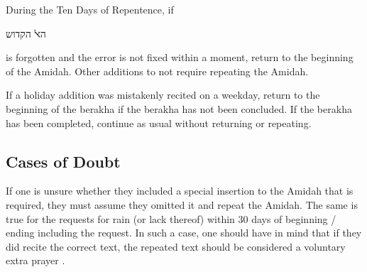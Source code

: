 \documentclass[11pt]{article}
\newcommand{\hebword}[1]{‎\begin{hebrew}\beginR #1 \endR\end{hebrew}}
\begin{document}
During the Ten Days of Repentence, if \hebword{הﭏ הקדוש} is forgotten and the error is not fixed within a moment, return to the beginning of the Amidah.  Other additions to not require repeating the Amidah.

If a holiday addition was mistakenly recited on a weekday, return to the beginning of the berakha if the berakha has not been concluded.  If the berakha has been completed, continue as usual without returning or repeating.

\subsection{Cases of Doubt}

If one is unsure whether they included a special insertion to the Amidah that is required, they must assume they omitted it and repeat the Amidah.  The same is true for the requests for rain (or lack thereof) within 30 days of beginning / ending including the request.  In such a case, one should have in mind that if they did recite the correct text, the repeated text should be considered a voluntary extra prayer \parencite*[18:6]{PH}.
\end{document}
